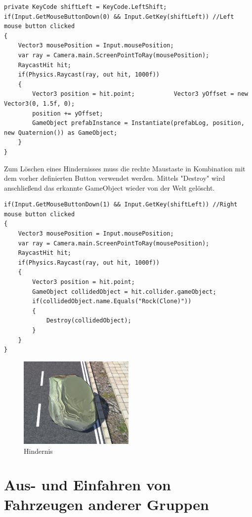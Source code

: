 \begin{lstlisting}[caption={Erstellen des Hindernisses},label={lst:Hinderniss_erstellen}]
private KeyCode shiftLeft = KeyCode.LeftShift;
if(Input.GetMouseButtonDown(0) && Input.GetKey(shiftLeft)) //Left mouse button clicked
{
	Vector3 mousePosition = Input.mousePosition;
	var ray = Camera.main.ScreenPointToRay(mousePosition);
	RaycastHit hit;
	if(Physics.Raycast(ray, out hit, 1000f))
	{
		Vector3 position = hit.point;			Vector3 yOffset = new Vector3(0, 1.5f, 0);
		position += yOffset;			
		GameObject prefabInstance = Instantiate(prefabLog, position, new Quaternion()) as GameObject;
	}
}
\end{lstlisting}

Zum Löschen eines Hindernisses muss die rechte Maustaste in Kombination mit dem vorher definierten Button verwendet werden. Mittels "Destroy" wird anschließend das erkannte GameObject wieder von der Welt gelöscht.

\begin{lstlisting}[caption={Zerstören des Hindernisses},label={lst:Hinderniss_zerstören}]
if(Input.GetMouseButtonDown(1) && Input.GetKey(shiftLeft)) //Right mouse button clicked
{
	Vector3 mousePosition = Input.mousePosition;
	var ray = Camera.main.ScreenPointToRay(mousePosition);
	RaycastHit hit;
	if(Physics.Raycast(ray, out hit, 1000f))
	{
		Vector3 position = hit.point;
		GameObject collidedObject = hit.collider.gameObject;
		if(collidedObject.name.Equals("Rock(Clone)"))
		{
			Destroy(collidedObject);
		}
	}
}
\end{lstlisting}

\begin{figure}[H]
\begin{center}
\includegraphics[width=0.5\textwidth]{BilderAllgemein/rock.PNG}
\end{center}
	\caption{Hindernis}
	\label{img:hindernis}
\end{figure}

\section{Aus- und Einfahren von Fahrzeugen anderer Gruppen}
\label{Aus-_und_Einfahren_von_Fahrzeugen_anderer_Gruppen}

